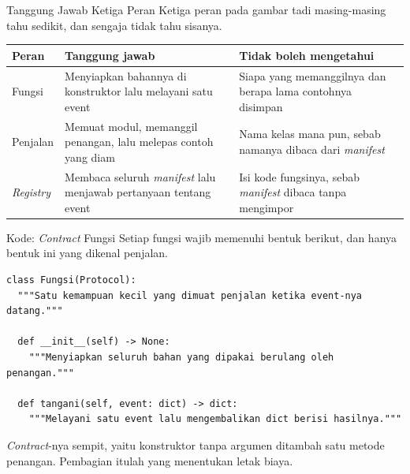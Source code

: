 \documentclass[aspectratio=169, table, 12pt]{beamer}
\begin{document}
\begin{frame}{{\Large Tanggung Jawab Ketiga Peran}}
  \vspace{10pt}
  {\small Ketiga peran pada gambar tadi masing-masing tahu sedikit, dan
  sengaja tidak tahu sisanya.}

  \vspace{4pt}
  \centering
  \small
  \begin{tabularx}{0.96\textwidth}{|l|>{\raggedright\arraybackslash}X|>{\raggedright\arraybackslash}X|}
    \hline
    \textbf{Peran} & \textbf{Tanggung jawab} & \textbf{Tidak boleh mengetahui} \\
    \hline
    Fungsi & Menyiapkan bahannya di konstruktor lalu melayani satu event & Siapa yang memanggilnya dan berapa lama contohnya disimpan \\
    \hline
    Penjalan & Memuat modul, memanggil penangan, lalu melepas contoh yang diam & Nama kelas mana pun, sebab namanya dibaca dari \textit{manifest} \\
    \hline
    \textit{Registry} & Membaca seluruh \textit{manifest} lalu menjawab pertanyaan tentang event & Isi kode fungsinya, sebab \textit{manifest} dibaca tanpa mengimpor \\
    \hline
  \end{tabularx}
\end{frame}

\begin{frame}[fragile]{{\Large Kode: \textit{Contract} Fungsi}}
  \vspace{10pt}
  {\small Setiap fungsi wajib memenuhi bentuk berikut, dan hanya bentuk ini
  yang dikenal penjalan.}
  \vspace{2pt}
\begin{lstlisting}[style=PythonStyle]
class Fungsi(Protocol):
  """Satu kemampuan kecil yang dimuat penjalan ketika event-nya datang."""

  def __init__(self) -> None:
    """Menyiapkan seluruh bahan yang dipakai berulang oleh penangan."""

  def tangani(self, event: dict) -> dict:
    """Melayani satu event lalu mengembalikan dict berisi hasilnya."""
\end{lstlisting}

  \vspace{2pt}
  {\small \textit{Contract}-nya sempit, yaitu konstruktor tanpa argumen
  ditambah satu metode penangan. Pembagian itulah yang menentukan letak biaya.}
\end{frame}
\end{document}
